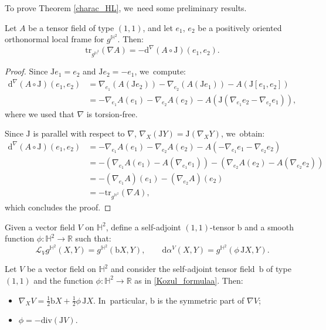 To prove Theorem \ref{charac_HL}, we~need some preliminary results.

\begin{lemma}\label{techniqual_computation}
Let \(A \) be a tensor field of type \((1,1) \), and let \(e_1 \), \(e_2 \) be a positively oriented orthonormal local frame for \(g^{\mathbb{H}^2} \). Then:
\[
\mathrm{tr}_{g^{\mathbb{H}^2}}(\nabla A) = -\mathrm{d}^{\nabla}(A \circ \mathrm{J})(e_1,e_2).
\]
\end{lemma}

\begin{proof}
Since \(\mathrm{J}e_1 = e_2 \) and \(\mathrm{J}e_2 = -e_1 \), we~compute:
\begin{align*}
\mathrm{d}^{\nabla}(A \circ \mathrm{J})(e_1,e_2)
&= \nabla_{e_1} (A(\mathrm{J}e_2)) - \nabla_{e_2} (A(\mathrm{J}e_1)) - A(\mathrm{J}[e_1, e_2]) \\
&= -\nabla_{e_1} A(e_1) - \nabla_{e_2} A(e_2) - A(\mathrm{J}(\nabla_{e_1}e_2 - \nabla_{e_2}e_1)),
\end{align*}
where we used that \(\nabla \) is torsion-free.

Since \(\mathrm{J} \) is parallel with respect to \(\nabla \), \ie \(\nabla_X(\mathrm{J}Y) = \mathrm{J}(\nabla_X Y) \), we~obtain:
\begin{align*}
\mathrm{d}^{\nabla}(A \circ \mathrm{J})(e_1,e_2)
&= -\nabla_{e_1} A(e_1) - \nabla_{e_2} A(e_2) - A(-\nabla_{e_1}e_1 - \nabla_{e_2}e_2) \\
&= -\left(\nabla_{e_1} A(e_1) - A(\nabla_{e_1} e_1) \right) - \left(\nabla_{e_2} A(e_2) - A(\nabla_{e_2} e_2) \right) \\
&= -(\nabla_{e_1} A)(e_1) - (\nabla_{e_2} A)(e_2) \\
&= -\mathrm{tr}_{g^{\mathbb{H}^2}}(\nabla A),
\end{align*}
which concludes the proof.
\end{proof}

Given a vector field $V$ on $\mathbb{H}^2$, define a self-adjoint $(1,1)$-tensor $\mathrm{b}$ and a smooth function $\phi:\mathbb{H}^2\to\mathbb{R}$ such that:
\begin{equation}\label{Kozul_formulaa}
\mathcal{L}_Vg^{\mathbb{H}^2}(X,Y)=g^{\mathbb{H}^2}(\mathrm{b} X,Y),
\qquad
\mathrm{d}\alpha^V(X,Y)=g^{\mathbb{H}^2}(\phi\, \mathrm{J} X,Y).
\end{equation}

\begin{lemma}\label{Kozul_formula}
Let $V$ be a vector field on $\mathbb{H}^2$ and consider the self-adjoint tensor field~$\mathrm{b}$ of type $(1,1)$ and the function $\phi:\mathbb{H}^2\to \mathbb{R}$ as in \eqref{Kozul_formulaa}. Then:
\begin{itemize}
\item $\nabla_X V = \frac{1}{2} \mathrm{b} X + \frac{1}{2} \phi\, \mathrm{J} X$. In~particular, $\mathrm{b}$ is the symmetric part of $\nabla V$;
\item $\phi = -\mathrm{div}(\mathrm{J} V)$.
\end{itemize}

\end{lemma}


